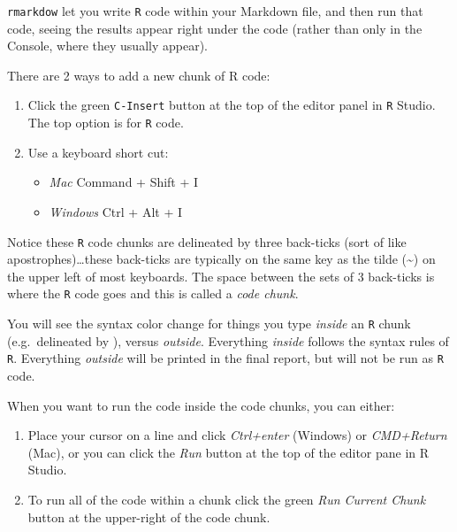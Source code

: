 \documentclass[
]{book}
\providecommand{\tightlist}{%
  \setlength{\itemsep}{0pt}\setlength{\parskip}{0pt}}
\newenvironment{rmdnote}[1]
  {
  \begin{itemize}
  \renewcommand{\labelitemi}{
    \raisebox{-.7\height}[0pt][0pt]{
      {\setkeys{Gin}{width=3em,keepaspectratio}\texttt{[image: images/\#1]}}
    }
  }
  \setlength{\fboxsep}{1em}
  \begin{note}
  \item
  }
  {
  \end{note}
  \end{itemize}
  }
\begin{document}
\texttt{rmarkdow} let you write \texttt{R} code within your Markdown file, and then run that code, seeing the results appear right under the code (rather than only in the Console, where they usually appear).

There are 2 ways to add a new chunk of R code:

\begin{enumerate}
\def\labelenumi{\arabic{enumi}.}
\tightlist
\item
  Click the green \texttt{C-Insert} button at the top of the editor panel in \texttt{R} Studio. The top option is for \texttt{R} code.\\
\item
  Use a keyboard short cut:

  \begin{itemize}
  \tightlist
  \item
    \emph{Mac} Command + Shift + I
  \item
    \emph{Windows} Ctrl + Alt + I
  \end{itemize}
\end{enumerate}

Notice these \texttt{R} code chunks are delineated by three back-ticks (sort of like apostrophes)\ldots these back-ticks are typically on the same key as the tilde (\textasciitilde) on the upper left of most keyboards. The space between the sets of 3 back-ticks is where the \texttt{R} code goes and this is called a \emph{code chunk}.

\begin{rmdnote}{note}
You will see the syntax color change for things you type \emph{inside} an \texttt{R} chunk (e.g.~delineated by \texttt{\textasciigrave{}\textasciigrave{}\textasciigrave{}}), versus \emph{outside}. Everything \emph{inside} follows the syntax rules of \texttt{R}. Everything \emph{outside} will be printed in the final report, but will not be run as \texttt{R} code.

\end{rmdnote}

When you want to run the code inside the code chunks, you can either:

\begin{enumerate}
\def\labelenumi{\arabic{enumi}.}
\tightlist
\item
  Place your cursor on a line and click \emph{Ctrl+enter} (Windows) or \emph{CMD+Return} (Mac), or you can click the \emph{Run} button at the top of the editor pane in R Studio.
\item
  To run all of the code within a chunk click the green \emph{Run Current Chunk} button at the upper-right of the code chunk.
\end{enumerate}
\end{document}
